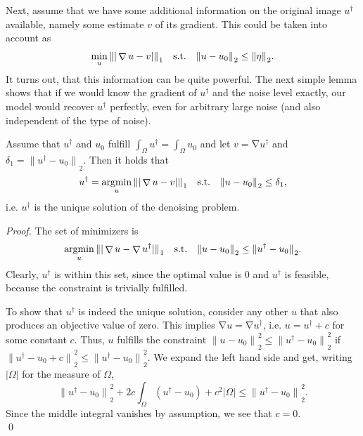 \documentclass[twocolumn,envcountsame]{svjour3}
\newcommand{\norm}[2][]{{\|{#2}\|_{}}_{#1}}
\newcommand{\abs}[1]{|#1|}
\newcommand{\udag}{u^{\dagger}}
\newcommand{\subjectto}{\text{\quad s.t.\quad }}
\DeclareMathOperator*{\argmin}{argmin}
\DeclareMathOperator{\grad}{\nabla}
\begin{document}
Next, assume that we have some additional information on the original image $\udag$ available, namely some estimate $v$ of its gradient.
This could be taken into account as
\begin{align}
	\min_u\norm[1]{\abs{\grad u - v}}\subjectto 
	\norm[2]{u-u_0}\leq \norm[2]{\eta}.
\end{align}
It turns out, that this information can be quite powerful.
The next simple lemma shows that if we would know the gradient of $\udag$ and the noise level exactly, our model would recover $\udag$ perfectly, even for arbitrary large noise (and also independent of the type of noise).
\begin{lemma}
  \label{lem:perfect-reconstruction-udag}
  Assume that $\udag$ and $u_{0}$ fulfill $\int_{\Omega}\udag = \int_{\Omega}u_{0}$ and
  let $v = \grad \udag$ and $\delta_{1} = \norm[2]{\udag-u_{0}}$. Then it holds that
  \begin{equation}
    \label{eq:tvgrad-true-delta}
    \udag = \argmin_u \norm[1]{\abs{\grad u-v}}
    \subjectto\norm[2]{u-u_0}\leq \delta_{1},
  \end{equation}
  i.e. $\udag$ is the unique solution of the denoising problem.
\end{lemma}
%
\begin{proof}
  The set of minimizers is
  \begin{align*}
    \argmin_{u}\norm[1]{\abs{\grad u - \grad\udag}}
    \subjectto \norm[2]{u-u_0}
    \leq\norm[2]{\udag - u_0}.
  \end{align*}
  Clearly, $\udag$ is within this set, since the optimal value
  is $0$ and $\udag$ is feasible, because the constraint is 
  trivially fulfilled.
  
  To show that $\udag$ is indeed the unique solution, consider any other $u$ that also produces an objective value of zero.
  This implies $\grad u = \grad\udag$, i.e. $u = \udag + c$ for some constant $c$.
  Thus, $u$ fulfills the constraint $\norm[2]{u-u_{0}}^{2}\leq \norm[2]{\udag-u_{0}}^{2}$ if $\norm[2]{\udag-u_{0} + c}^{2}\leq \norm[2]{\udag-u_{0}}^{2}$.
  We expand the left hand side and get, writing $\abs{\Omega}$ for the measure of $\Omega$,
  \[
  \norm[2]{\udag-u_{0}}^{2} + 2c\int_{\Omega}(\udag-u_{0}) + c^{2}\abs{\Omega} \leq \norm[2]{\udag-u_{0}}^{2}.
  \]
  Since the middle integral vanishes by assumption, we see that $c=0$.\\
  \qed
\end{proof}
\end{document}
